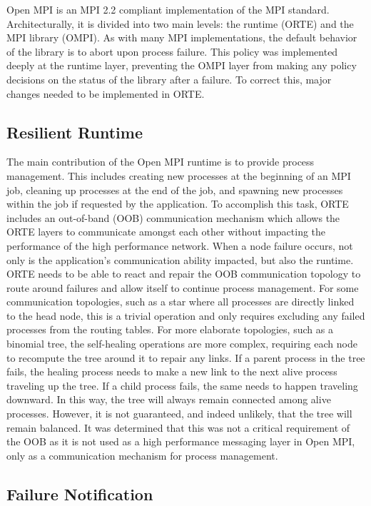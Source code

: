 Open MPI is an MPI 2.2 compliant implementation of the MPI standard.
Architecturally, it is divided into two main levels: the runtime (ORTE) and the
MPI library (OMPI). As with many MPI implementations, the default behavior of
the library is to abort upon process failure. This policy was implemented deeply
at the runtime layer, preventing the OMPI layer from making any policy decisions
on the status of the library after a failure. To correct this, major changes
needed to be implemented in ORTE.

\subsection{Resilient Runtime}\label{subsect:cof:ompi:resilient}

The main contribution of the Open MPI runtime is to provide process management.
This includes creating new processes at the beginning of an MPI job, cleaning up
processes at the end of the job, and spawning new processes within the job if
requested by the application. To accomplish this task, ORTE includes an
out-of-band (OOB) communication mechanism which allows the ORTE layers to
communicate amongst each other without impacting the performance of the high 
performance network. When a node failure occurs, not only is the application's 
communication ability impacted, but also the runtime. ORTE needs to be able to react and repair
the OOB communication topology to route around failures and allow itself to
continue process management. For some communication topologies, such as a star 
where all processes are directly linked to the head node,
this is a trivial operation and only requires excluding any failed processes
from the routing tables. For more elaborate topologies, such as a binomial tree,
the self-healing operations are more complex, requiring each node to recompute
the tree around it to repair any links. If a parent process in the tree fails,
the healing process needs to make a new link to the next alive process
traveling up the tree. If a child process fails, the same needs to happen
traveling downward. In this way, the tree will always remain connected among
alive processes. However, it is not guaranteed, and indeed unlikely, that the tree
will remain balanced. It was determined that this was not a critical requirement
of the OOB as it is not used as a high performance messaging layer in Open MPI,
only as a communication mechanism for process management.

\subsection{Failure Notification}\label{subsect:cof:ompi:notification}

